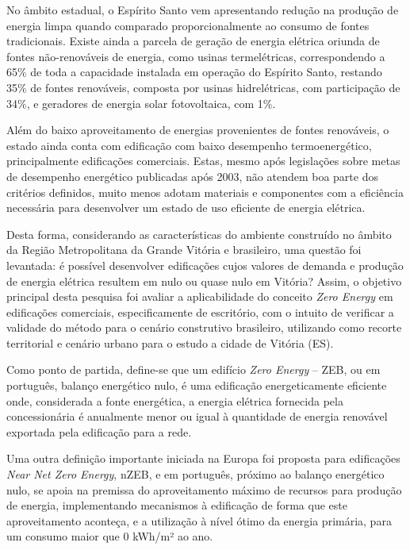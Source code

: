 \begin{onehalfspace}
    \noindent No âmbito estadual, o Espírito Santo vem apresentando redução na produção de energia limpa quando comparado proporcionalmente ao consumo de fontes tradicionais. Existe ainda a parcela de geração de energia elétrica oriunda de fontes não-renováveis de energia, como usinas termelétricas, correspondendo a 65\% de toda a capacidade instalada em operação do Espírito Santo, restando 35\% de fontes renováveis, composta por usinas hidrelétricas, com participação de 34\%, e geradores de energia solar fotovoltaica, com 1\%.\vspace*{0.3cm}

    \noindent Além do baixo aproveitamento de energias provenientes de fontes renováveis, o estado ainda conta com edificação com baixo desempenho termoenergético, principalmente edificações comerciais. Estas, mesmo após legislações sobre metas de desempenho energético publicadas após 2003, não atendem boa parte dos critérios definidos, muito menos adotam materiais e componentes com a eficiência necessária para desenvolver um estado de uso eficiente de energia elétrica.\vspace*{0.3cm}

    \noindent Desta forma, considerando as características do ambiente construído no âmbito da Região Metropolitana da Grande Vitória e brasileiro, uma questão foi levantada: é possível desenvolver edificações cujos valores de demanda e produção de energia elétrica resultem em nulo ou quase nulo em Vitória? Assim, o objetivo principal desta pesquisa foi avaliar a aplicabilidade do conceito \textit{Zero Energy} em edificações comerciais, especificamente de escritório, com o intuito de verificar a validade do método para o cenário construtivo brasileiro, utilizando como recorte territorial e cenário urbano para o estudo a cidade de Vitória (ES).\vspace*{0.3cm}

    \noindent Como ponto de partida, define-se que um edifício \textit{Zero Energy} – ZEB, ou em português, balanço energético nulo, é uma edificação energeticamente eficiente onde, considerada a fonte energética, a energia elétrica fornecida pela concessionária é anualmente menor ou igual à quantidade de energia renovável exportada pela edificação para a rede.\vspace*{0.3cm}

    \noindent Uma outra definição importante iniciada na Europa foi proposta para edificações \textit{Near Net Zero Energy}, nZEB, e em português, próximo ao balanço energético nulo, se apoia na premissa do aproveitamento máximo de recursos para produção de energia, implementando mecanismos à edificação de forma que este aproveitamento aconteça, e a utilização à nível ótimo da energia primária, para um consumo maior que 0 kWh/m² ao ano.\vspace*{0.3cm}


\end{onehalfspace}

